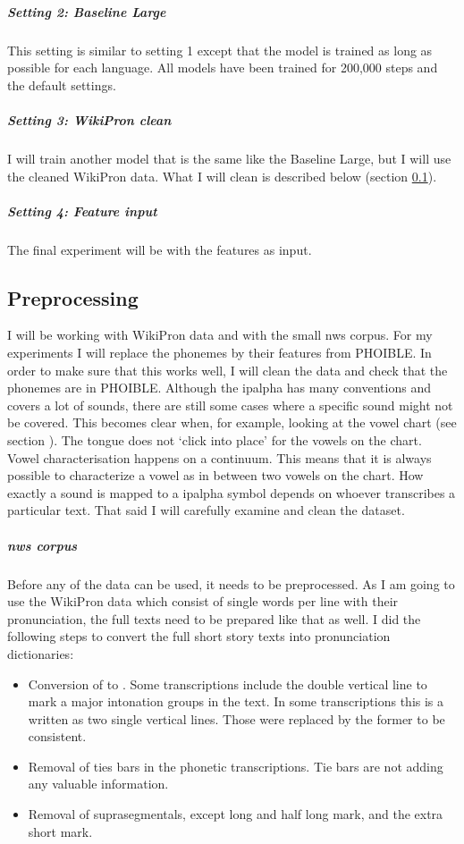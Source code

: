 \subparagraph{Setting 2: Baseline Large}
This setting is similar to setting 1 except that the model is trained as long as possible for each language. All models have been trained for 200,000 steps and the default settings. 

\subparagraph{Setting 3: WikiPron clean}
I will train another model that is the same like the Baseline Large, but I will use the cleaned WikiPron data. What I will clean is described below (section \ref{preprocess}).

\subparagraph{Setting 4: Feature input}
The final experiment will be with the features as input.  

\subsection{Preprocessing}
\label{preprocess}
I will be working with WikiPron data and with the small \ac{nws} corpus. For my experiments I will replace the phonemes by their features from PHOIBLE. In order to make sure that this works well, I will clean the data and check that the phonemes are in PHOIBLE. Although the \ac{ipalpha} has many conventions and covers a lot of sounds, there are still some cases where a specific sound might not be covered. This becomes clear when, for example, looking at the vowel chart (see section ). The tongue does not `click into place' for the vowels on the chart. Vowel characterisation happens on a continuum. This means that it is always possible to characterize a vowel as in between two vowels on the chart. How exactly a sound is mapped to a \ac{ipalpha} symbol depends on whoever transcribes a particular text. That said I will carefully examine and clean the dataset. 

\subparagraph{\ac{nws} corpus}
Before any of the data can be used, it needs to be preprocessed. As I am going to use the WikiPron data which consist of single words per line with their pronunciation, the full texts need to be prepared like that as well. I did the following steps to convert the full short story texts into pronunciation dictionaries:

\begin{itemize}
\item Conversion of \textipa{\textvertline \textvertline} to \textipa{\textdoublevertline}. Some transcriptions include the double vertical line to mark a major intonation groups in the text. In some transcriptions this is a written as two single vertical lines. Those were replaced by the former to be consistent. 
\item Removal of ties bars in the phonetic transcriptions. Tie bars are not adding any valuable information. 
\item Removal of suprasegmentals, except long and half long mark, and the extra short mark. 
\end{itemize}


